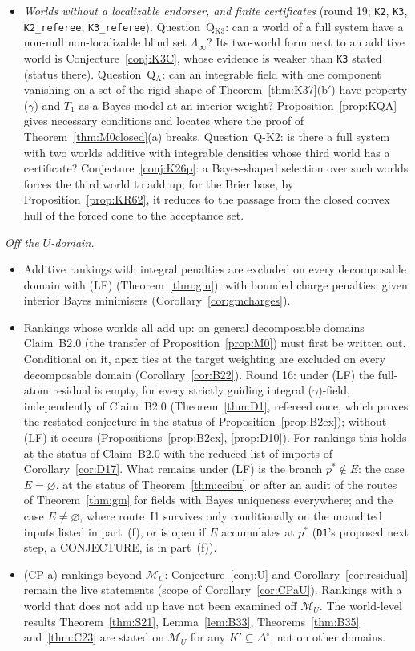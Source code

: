 \documentclass[11pt]{article}
\theoremstyle{definition}
\theoremstyle{remark}
\newcommand{\Di}{\Delta^{\circ}}
\newcommand{\M}{\mathcal M}
\newcommand{\src}[1]{\texttt{#1}}
\begin{document}
\begin{itemize}[leftmargin=*]
\item \emph{Worlds without a localizable endorser, and finite certificates} (round 19; \src{K2}, \src{K3}, \src{K2\_referee}, \src{K3\_referee}). Question~Q$_{\mathrm{K3}}$: can a world of a full system have a non-null non-localizable blind set $\Lambda_\infty$? Its two-world form next to an additive world is Conjecture~\ref{conj:K3C}, whose evidence is weaker than \src{K3} stated (status there). Question~Q$_{\mathrm A}$: can an integrable field with one component vanishing on a set of the rigid shape of Theorem~\ref{thm:K37}(b$'$) have property ($\gamma$) and $T_1$ as a Bayes model at an interior weight? Proposition~\ref{prop:KQA} gives necessary conditions and locates where the proof of Theorem~\ref{thm:M0closed}(a) breaks. Question~Q-K2: is there a full system with two worlds additive with integrable densities whose third world has a certificate? Conjecture~\ref{conj:K26p}: a Bayes-shaped selection over such worlds forces the third world to add up; for the Brier base, by Proposition~\ref{prop:KR62}, it reduces to the passage from the closed convex hull of the forced cone to the acceptance set.
\end{itemize}
\emph{Off the $U$-domain.}
\begin{itemize}[leftmargin=*]
\item Additive rankings with integral penalties are excluded on every decomposable domain with (LF) (Theorem~\ref{thm:gm}); with bounded charge penalties, given interior Bayes minimisers (Corollary~\ref{cor:gmcharges}).
\item Rankings whose worlds all add up: on general decomposable domains Claim~B2.0 (the transfer of Proposition~\ref{prop:M0}) must first be written out. Conditional on it, apex ties at the target weighting are excluded on every decomposable domain (Corollary~\ref{cor:B22}). Round 16: under (LF) the full-atom residual is empty, for every strictly guiding integral ($\gamma$)-field, independently of Claim~B2.0 (Theorem~\ref{thm:D1}, refereed once, which proves the restated conjecture in the status of Proposition~\ref{prop:B2ex}); without (LF) it occurs (Propositions~\ref{prop:B2ex}, \ref{prop:D10}). For rankings this holds at the status of Claim~B2.0 with the reduced list of imports of Corollary~\ref{cor:D17}. What remains under (LF) is the branch $p^*\notin E$: the case $E=\varnothing$, at the status of Theorem~\ref{thm:ccibu} or after an audit of the routes of Theorem~\ref{thm:gm} for fields with Bayes uniqueness everywhere; and the case $E\ne\varnothing$, where route~I1 survives only conditionally on the unaudited inputs listed in part~(f), or is open if $E$ accumulates at $p^*$ (\src{D1}'s proposed next step, a CONJECTURE, is in part~(f)).
\item (CP-a) rankings beyond $\M_U$: Conjecture~\ref{conj:U} and Corollary~\ref{cor:residual} remain the live statements (scope of Corollary~\ref{cor:CPaU}). Rankings with a world that does not add up have not been examined off $\M_U$. The world-level results Theorem~\ref{thm:S21}, Lemma~\ref{lem:B33}, Theorems~\ref{thm:B35} and~\ref{thm:C23} are stated on $\M_U$ for any $K'\subseteq\Di$, not on other domains.
\end{itemize}
\end{document}
